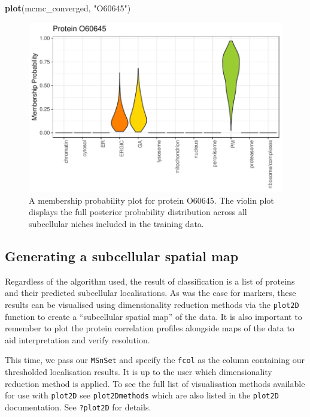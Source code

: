\documentclass[9pt,a4paper,]{extarticle}
\newenvironment{Shaded}{\begin{snugshade}}{\end{snugshade}}
\newcommand{\FunctionTok}[1]{\textcolor[rgb]{0.13,0.29,0.53}{\textbf{#1}}}
\newcommand{\NormalTok}[1]{#1}
\newcommand{\StringTok}[1]{\textcolor[rgb]{0.31,0.60,0.02}{#1}}
\begin{document}
\begin{Shaded}
\begin{Highlighting}[]
\FunctionTok{plot}\NormalTok{(mcmc\_converged, }\StringTok{"O60645"}\NormalTok{)}
\end{Highlighting}
\end{Shaded}

\begin{figure}[H]

{\centering \includegraphics[width=0.7\linewidth,]{figs/multiloc_violin} 

}

\caption{A membership probability plot for protein O60645. The violin plot displays the full posterior probability distribution across all subcellular niches included in the training data.}\label{fig:mcmc-violin}
\end{figure}

\subsection{Generating a subcellular spatial map}\label{generating-a-subcellular-spatial-map}

Regardless of the algorithm used, the result of classification is a list of
proteins and their predicted subcellular localisations. As was the case for
markers, these results can be visualised using dimensionality reduction methods
via the \texttt{plot2D} function to create a ``subcellular spatial map'' of the data. It
is also important to remember to plot the protein correlation profiles alongside
maps of the data to aid interpretation and verify resolution.

This time, we pass our \texttt{MSnSet} and specify the \texttt{fcol} as the column containing
our thresholded localisation results. It is up to the user which dimensionality
reduction method is applied. To see the full list of visualisation methods
available for use with \texttt{plot2D} see \texttt{plot2Dmethods} which are also listed in the
\texttt{plot2D} documentation. See \texttt{?plot2D} for details.
\end{document}
